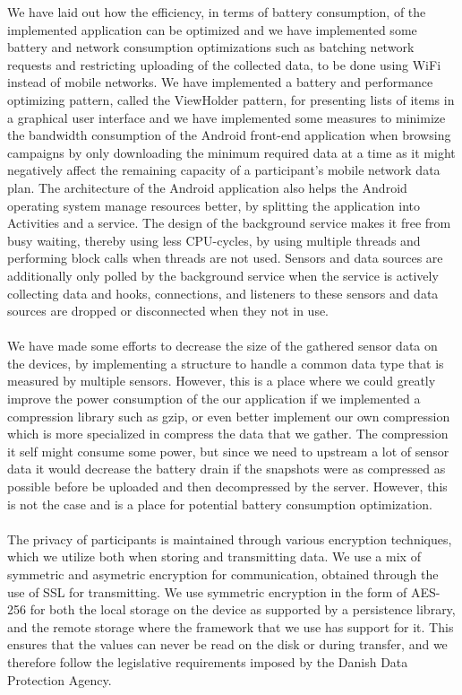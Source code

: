 We have laid out how the efficiency, in terms of battery consumption, of the implemented application can be optimized and we have implemented some battery and network consumption optimizations such as batching network requests and restricting uploading of the collected data, to be done using WiFi instead of mobile networks. We have implemented a battery and performance optimizing pattern, called the ViewHolder pattern, for presenting lists of items in a graphical user interface and we have implemented some measures to minimize the bandwidth consumption of the Android front-end application when browsing campaigns by only downloading the minimum required data at a time as it might negatively affect the remaining capacity of a participant's mobile network data plan. The architecture of the Android application also helps the Android operating system manage resources better, by splitting the application into Activities and a service. The design of the background service makes it free from busy waiting, thereby using less CPU-cycles, by using multiple threads and performing block calls when threads are not used. Sensors and data sources are additionally only polled by the background service when the service is actively collecting data and hooks, connections, and listeners to these sensors and data sources are dropped or disconnected when they not in use. 
\\\\
We have made some efforts to decrease the size of the gathered sensor data on the devices, by implementing a structure to handle a common data type that is measured by multiple sensors. However, this is a place where we could greatly improve the power consumption of the our application if we implemented a compression library such as gzip, or even better implement our own compression which is more specialized in compress the data that we gather. The compression it self might consume some power, but since we need to upstream a lot of sensor data it would decrease the battery drain if the snapshots were as compressed as possible before be uploaded and then decompressed by the server. However, this is not the case and is a place for potential battery consumption optimization.
\\\\
The privacy of participants is maintained through various encryption techniques, which we utilize both when storing and transmitting data. We use a mix of symmetric and asymetric encryption for communication, obtained through the use of SSL for transmitting. We use symmetric encryption in the form of AES-256 for both the local storage on the device as supported by a persistence library, and the remote storage where the framework that we use has support for it. This ensures that the values can never be read on the disk or during transfer, and we therefore follow the legislative requirements imposed by the Danish Data Protection Agency. 
